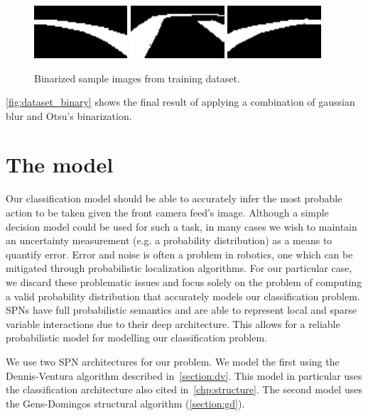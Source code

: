 \begin{figure}[h]
  \centering\includegraphics[width=0.31\textwidth]{imgs/binary_left.png}
  \includegraphics[width=0.31\textwidth]{imgs/binary_up.png}
  \includegraphics[width=0.31\textwidth]{imgs/binary_right.png}
  \caption{Binarized sample images from training dataset.\label{fig:dataset_binary}}
\end{figure}

\autoref{fig:dataset_binary} shows the final result of applying a combination of gaussian blur and
Otsu's binarization.

\section{The model}

Our classification model should be able to accurately infer the most probable action to be taken
given the front camera feed's image. Although a simple decision model could be used for such a
task, in many cases we wish to maintain an uncertainty measurement (e.g. a probability
distribution) as a means to quantify error. Error and noise is often a problem in robotics, one
which can be mitigated through probabilistic localization algorithms. For our particular case, we
discard these problematic issues and focus solely on the problem of computing a valid probability
distribution that accurately models our classification problem. SPNs have full probabilistic
semantics and are able to represent local and sparse variable interactions due to their deep
architecture. This allows for a reliable probabilistic model for modelling our classification
problem.

We use two SPN architectures for our problem. We model the first using the Dennis-Ventura algorithm
described in~\autoref{section:dv}. This model in particular uses the classification architecture
also cited in~\autoref{chp:structure}. The second model uses the Gens-Domingos structural algorithm
(\autoref{section:gd}).


